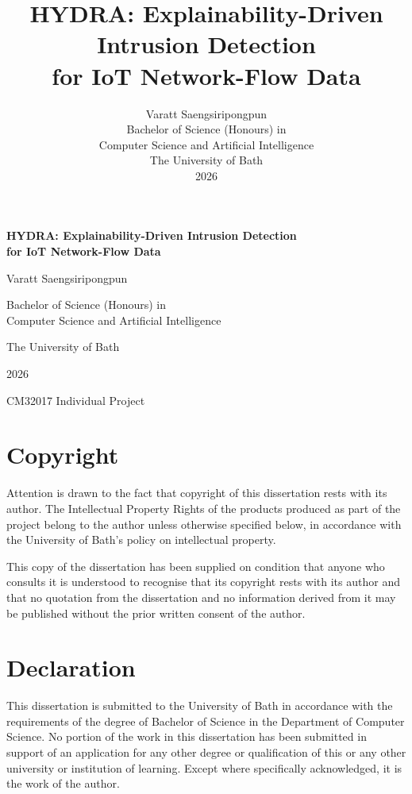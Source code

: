 \documentclass[12pt,a4paper]{report}
\title{\textbf{HYDRA: Explainability-Driven Intrusion Detection\\for IoT Network-Flow Data}}
\author{Varatt Saengsiripongpun\\[1em]
Bachelor of Science (Honours) in\\Computer Science and Artificial Intelligence\\[1em]
The University of Bath\\[1em]
2026}
\date{}
\begin{document}
\begin{titlepage}
\centering
\vspace*{2cm}
{\LARGE\bfseries HYDRA: Explainability-Driven Intrusion Detection\\[0.3em] for IoT Network-Flow Data\par}
\vspace{2cm}
{\Large Varatt Saengsiripongpun\par}
\vspace{1.5cm}
{\large Bachelor of Science (Honours) in\\Computer Science and Artificial Intelligence\par}
\vspace{1.5cm}
{\large The University of Bath\par}
\vspace{1cm}
{\large 2026\par}
\vfill
{\normalsize CM32017 Individual Project\par}
\end{titlepage}

\newpage
\thispagestyle{empty}
\section*{Copyright}
Attention is drawn to the fact that copyright of this dissertation rests with its author. The Intellectual Property Rights of the products produced as part of the project belong to the author unless otherwise specified below, in accordance with the University of Bath's policy on intellectual property.

This copy of the dissertation has been supplied on condition that anyone who consults it is understood to recognise that its copyright rests with its author and that no quotation from the dissertation and no information derived from it may be published without the prior written consent of the author.

\section*{Declaration}
This dissertation is submitted to the University of Bath in accordance with the requirements of the degree of Bachelor of Science in the Department of Computer Science. No portion of the work in this dissertation has been submitted in support of an application for any other degree or qualification of this or any other university or institution of learning. Except where specifically acknowledged, it is the work of the author.
\end{document}
